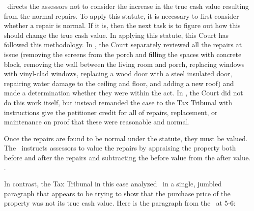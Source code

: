 \documentclass[12pt,\documentclassflag]{michiganCourtOfAppealsBrief}
\def\mathieuGast{\pincite[l]{MCL}{211.27(2)}}
\begin{document}
\mathieuGast\ directs the assessors not to consider the increase in the true cash value resulting from the normal repairs. To apply this statute, it is necessary to first consider whether a repair is normal. If it is, then the next task is to figure out how this should change the true cash value. In applying this statute, this Court has followed this methodology. In \cite{Coyne}, the Court separately reviewed all the repairs at issue (removing the screens from the porch and filling the spaces with concrete block, removing the wall between the living room and porch, replacing windows with vinyl-clad windows, replacing a wood door with a steel insulated door, repairing water damage to the ceiling and floor, and adding a new roof) and made a determination whether they were within the act. In \cite{Fisher}, the Court did not do this work itself, but instead remanded the case to the Tax Tribunal with instructions give the petitioner credit for all of repairs, replacement, or maintenance on proof that these were reasonable and normal.

Once the repairs are found to be normal under the statute, they must be valued. The \STC\ instructs assessors to value the repairs by appraising the property both before and after the repairs and subtracting the before value from the after value. .

In contrast, the Tax Tribunal in this case analyzed \mathieuGast\ in a single, jumbled paragraph that appears to be trying to show that the purchase price of the property was not its true cash value. Here is the paragraph from the \POJ\ at 5-6:
\end{document}
